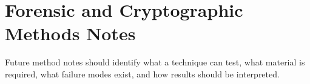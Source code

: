 \chapter{Forensic and Cryptographic Methods Notes}


Future method notes should identify what a technique can test, what material is required, what failure modes exist, and how results should be interpreted.

